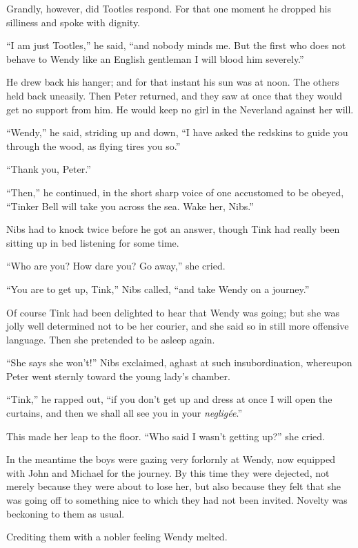 Grandly, however, did Tootles respond. For that one moment he dropped
his silliness and spoke with dignity.

``I am just Tootles,'' he said, ``and nobody minds me. But the first who
does not behave to Wendy like an English gentleman I will blood him
severely.''

He drew back his hanger; and for that instant his sun was at noon. The
others held back uneasily. Then Peter returned, and they saw at once
that they would get no support from him. He would keep no girl in the
Neverland against her will.

``Wendy,'' he said, striding up and down, ``I have asked the redskins to
guide you through the wood, as flying tires you so.''

``Thank you, Peter.''

``Then,'' he continued, in the short sharp voice of one accustomed to be
obeyed, ``Tinker Bell will take you across the sea. Wake her, Nibs.''

Nibs had to knock twice before he got an answer, though Tink had really
been sitting up in bed listening for some time.

``Who are you? How dare you? Go away,'' she cried.

``You are to get up, Tink,'' Nibs called, ``and take Wendy on a journey.''

Of course Tink had been delighted to hear that Wendy was going; but she
was jolly well determined not to be her courier, and she said so in
still more offensive language. Then she pretended to be asleep again.

``She says she won't!'' Nibs exclaimed, aghast at such insubordination,
whereupon Peter went sternly toward the young lady's chamber.

``Tink,'' he rapped out, ``if you don't get up and dress at once I will
open the curtains, and then we shall all see you in your \emph{negligée}.''

This made her leap to the floor. ``Who said I wasn't getting up?'' she
cried.

In the meantime the boys were gazing very forlornly at Wendy, now
equipped with John and Michael for the journey. By this time they were
dejected, not merely because they were about to lose her, but also
because they felt that she was going off to something nice to which
they had not been invited. Novelty was beckoning to them as usual.

Crediting them with a nobler feeling Wendy melted.

